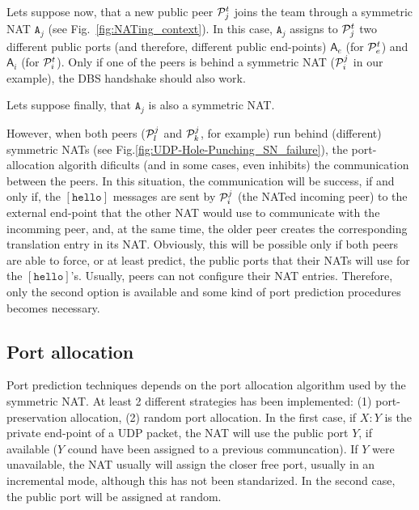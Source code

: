 Lets suppose now, that a new public peer ${\cal P}^t_j$ joins the team
through a symmetric NAT $\mathtt{A}_j$ (see
Fig.~\ref{fig:NATing_context}). In this case, $\mathtt{A}_j$ assigns
to ${\cal P}^t_j$ two different public ports (and therefore, different
public end-points) $\mathsf{A}_e$ (for ${\cal P}^t_e$) and
$\mathsf{A}_i$ (for ${\cal P}^t_i$). Only if one of the peers is
behind a symmetric NAT (${\cal P}^j_i$ in our example), the DBS
handshake should also work.

Lets suppose finally, that $\mathtt{A}_j$ is also a symmetric NAT.

 However, when both peers (${\cal P}^j_l$ and
${\cal P}^j_k$, for example) run behind (different) symmetric NATs
(see Fig.\ref{fig:UDP-Hole-Punching_SN_failure}), the port-allocation
algorith dificults (and in some cases, even inhibits) the
communication between the peers. In this situation, the communication
will be success, if and only if, the $[\mathtt{hello}]$ messages are
sent by ${\cal P}^j_i$ (the NATed incoming peer) to the external
end-point that the other NAT would use to communicate with the
incomming peer, and, at the same time, the older peer creates the
corresponding translation entry in its NAT. Obviously, this will be
possible only if both peers are able to force, or at least predict,
the public ports that their NATs will use for the
$[\mathtt{hello}]$'s. Usually, peers can not configure their NAT
entries. Therefore, only the second option is available and some kind
of port prediction procedures becomes necessary.

\subsection{Port allocation}
Port prediction techniques depends on the port allocation algorithm
used by the symmetric NAT. At least 2 different strategies has been
implemented: (1) port-preservation allocation, (2) random port
allocation. In the first case, if $X:Y$ is the private end-point of a
UDP packet, the NAT will use the public port $Y$, if available ($Y$
cound have been assigned to a previous communcation). If $Y$ were
unavailable, the NAT usually will assign the closer free port, usually
in an incremental mode, although this has not been standarized. In the
second case, the public port will be assigned at random.

